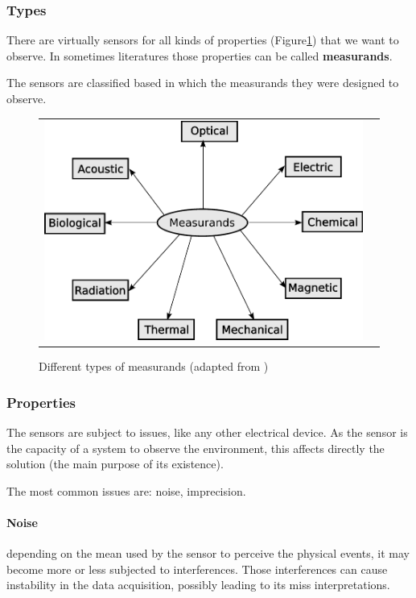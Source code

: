 \subsubsection{Types}

There are virtually sensors for all kinds of properties (Figure\ref{fig:sensors}) that we want to observe. In sometimes literatures those properties can be called \textbf{measurands}. 

The sensors are classified based in which the measurands they were designed to observe.

\begin{figure}[h]
   \centering
     \begin{tabular}{lr}
       \includegraphics[scale=0.70]{img/fig:sensors}
     \end{tabular}
   \caption{Different types of measurands (adapted from \cite{WhiteRichard})}
   \label{fig:sensors}
 \end{figure}

\subsubsection{Properties}

The sensors are subject to issues, like any other electrical device. As the sensor is the capacity of a system to observe the environment, this affects directly the solution (the main purpose of its existence).

The most common issues are: noise, imprecision. 

\paragraph{Noise} depending on the mean used by the sensor to perceive the physical events, it may become more or less subjected to interferences. Those interferences can cause instability in the data acquisition, possibly leading to its miss interpretations.

